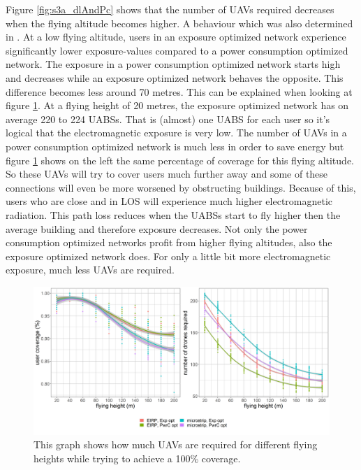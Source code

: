 Figure \ref{fig:s3a_dlAndPc}  shows that the number of \gls{UAV}s required decreases when the flying altitude becomes higher. A behaviour which was also determined in \cite{J2}.
At a low flying altitude, users in an exposure optimized network experience significantly lower exposure-values compared to a power consumption optimized network.
The exposure in a power consumption  optimized network starts high and 
decreases while an exposure optimized network behaves the opposite. This difference becomes less 
around 70 metres.
This can be explained when looking at figure \ref{fig:s3a_numDronesAndCov}.
At a flying height of 20 metres, the exposure optimized network has on average 220 to 224 \gls{UABS}s. That is (almost) one \gls{UABS} for each user
so it's logical that the electromagnetic exposure is very low.
The number of \gls{UAV}s in a power consumption optimized network is much less in order 
to save energy but figure \ref{fig:s3a_numDronesAndCov} shows on the  left the same percentage of coverage for this flying altitude.
So these \gls{UAV}s will try to cover users much further away and some of these connections will even be more worsened by obstructing buildings.
Because of this, users who are close and in \gls{LOS} will experience much higher electromagnetic radiation.
This path loss reduces when the \gls{UABS}s start to fly higher then the average  building and therefore exposure decreases.
Not only the power consumption optimized networks profit from higher flying altitudes, also the exposure optimized network does. For only a little bit 
more electromagnetic exposure, much less \gls{UAV}s are required.

\begin{figure}[]
  \includegraphics[width=\textwidth]{../results/s3/fhvsnumdronesAndCov.png}
  \caption{This graph shows how much \gls{UAV}s are required for different flying heights while trying to achieve a 100\% coverage.}
  \label{fig:s3a_numDronesAndCov}
\end{figure}

